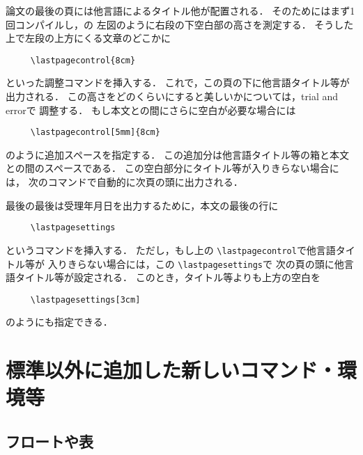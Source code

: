 \documentclass[onecolumn]{jsce}  %
\begin{document}
論文の最後の頁には他言語によるタイトル他が配置される．
そのためにはまず1回コンパイルし，\figno{\ref{fig:layout}}の
左図のように右段の下空白部の高さを測定する．
そうした上で左段の上方にくる文章のどこかに
\begin{verbatim}
     \lastpagecontrol{8cm}
\end{verbatim}
といった調整コマンドを挿入する．
これで，この頁の下に他言語タイトル等が出力される．
この高さをどのくらいにすると美しいかについては，trial and errorで
調整する．
もし本文との間にさらに空白が必要な場合には
\begin{verbatim}
     \lastpagecontrol[5mm]{8cm}
\end{verbatim}
のように追加スペースを指定する．
この追加分は他言語タイトル等の箱と本文との間のスペースである．
この空白部分にタイトル等が入りきらない場合には，
次のコマンドで自動的に次頁の頭に出力される．

最後の最後は受理年月日を出力するために，本文の最後の行に
\begin{verbatim}
     \lastpagesettings
\end{verbatim}
というコマンドを挿入する．
ただし，もし上の \verb+\lastpagecontrol+で他言語タイトル等が
入りきらない場合には，この \verb+\lastpagesettings+で
次の頁の頭に他言語タイトル等が設定される．
このとき，タイトル等よりも上方の空白を
\begin{verbatim}
     \lastpagesettings[3cm]
\end{verbatim}
のようにも指定できる．

\section{標準以外に追加した新しいコマンド・環境等}

\subsection{フロートや表}
\end{document}
